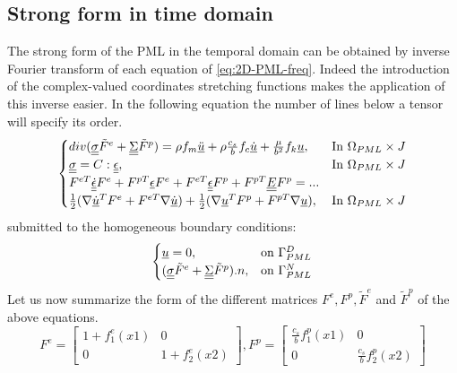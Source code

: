 \subsection{Strong form in time domain}
\par The strong form of the PML in the temporal domain can be obtained by inverse Fourier transform of each equation of \ref{eq:2D-PML-freq}. Indeed the introduction of the complex-valued coordinates stretching functions makes the application of this inverse easier. In the following equation the number of lines below a tensor will specify its order. 
\begin{equation}
\begin{cases}
div(\underline{\underline{\sigma}}\tilde{F}^e + \underline{\underline{\Sigma}}\tilde{F}^p) = \rho f_m \underline{\ddot{u}} + \rho \frac{c_s}{b} f_c \underline{\dot{u}} + \frac{\mu}{b^2}f_k \underline{u}, & \text{In } \Omega_{PML} \times J\\
\underline{\underline{\sigma}} =  C : \underline{\underline{\epsilon}} , & \text{In } \Omega_{PML} \times J\\
F^{eT} \underline{\underline{\dot{\epsilon}}}F^e + F^{pT}\underline{\epsilon}F^e + F^{eT}\underline{\underline{\epsilon}}F^p + F^{pT} \underline{\underline{E}} F^p = ...\\
\frac{1}{2}(\nabla \underline{\dot{u}}^T F^e + F^{eT} \nabla \underline{\dot{u}})+\frac{1}{2}(\nabla \underline{u}^T F^p + F^{pT} \nabla \underline{u}), & \text{In } \Omega_{PML} \times J\\
\end{cases}
\label{eq:2D-PML-strong-timeD}
\end{equation}
submitted to the homogeneous boundary conditions:
\begin{equation}
\begin{cases}
\underline{u}=0,& \text{on } \Gamma_{PML}^D\\
(\underline{\underline{\sigma}}\tilde{F}^e + \underline{\underline{\Sigma}}\tilde{F}^p).n , & \text{on } \Gamma_{PML}^N 
\end{cases}
\label{eq:conditions-lim}
\end{equation}
Let us now summarize the form of the different matrices $F^e,F^p,\tilde{F}^e$ and $\tilde{F}^p$ of the above equations.
\begin{equation}
F^e = \begin{bmatrix}
1+f^e_1(x1)&0\\0&1+f^e_2(x2)
\end{bmatrix}, F^p = \begin{bmatrix}
\frac{c_s}{b}f^p_1(x1)&0\\0&\frac{c_s}{b}f^p_2(x2) 
\end{bmatrix} 
\end{equation}

